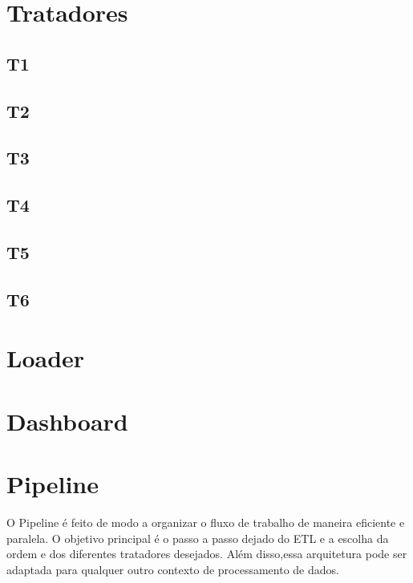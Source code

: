 \documentclass[a4paper,12pt]{article}
\begin{document}
\section{Tratadores}
\subsection{T1}
\subsection{T2}
\subsection{T3}
\subsection{T4}
\subsection{T5}
\subsection{T6}


\section{Loader}


\section{Dashboard}

\section{Pipeline}
O Pipeline é feito de modo a organizar o fluxo de trabalho de maneira eficiente e paralela. O objetivo principal é o passo a passo dejado do ETL e a escolha da ordem e dos diferentes tratadores desejados. Além disso,essa arquitetura pode ser adaptada para qualquer outro contexto de processamento de dados.
\end{document}

